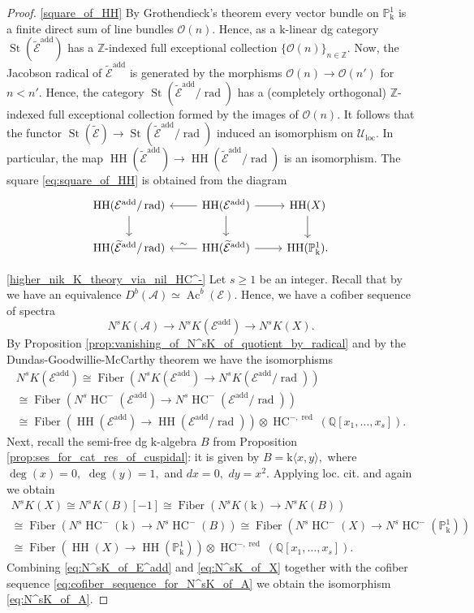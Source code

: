\documentclass[11pt,leqno]{amsart}
\numberwithin{equation}{section}
\def\Z{\mathbb{Z}}
\def\Q{\mathbb{Q}}
\def\wt{\widetilde}
\def\PP{{\mathbb P}}
\def\rad{\operatorname{rad}}
\newcommand{\Fiber}{\operatorname{Fiber}}
\newcommand{\loc}{\operatorname{loc}}
\newcommand{\red}{\operatorname{red}}
\newcommand{\St}{\operatorname{St}}
\newcommand{\mk}{\mathrm k}
\newcommand{\cO}{{\mathcal O}}
\newcommand{\cA}{{\mathcal A}}
\newcommand{\cE}{{\mathcal E}}
\newcommand{\cU}{{\mathcal U}}
\newcommand{\la}{\langle}
\newcommand{\ra}{\rangle}
\newcommand{\HH}{\operatorname{HH}}
\newcommand{\HC}{\operatorname{HC}}
\newcommand{\add}{\operatorname{add}}
\newcommand{\Ac}{\operatorname{Ac}}
\begin{document}
\begin{proof}
\ref{square_of_HH} By Grothendieck's theorem every vector bundle on $\PP^1_{\mk}$ is a finite direct sum of line bundles $\cO(n).$ Hence, as a $\mk$-linear dg category $\St(\wt{\cE}^{\add})$ has a $\Z$-indexed full exceptional collection $\{\cO(n)\}_{n\in\Z}.$ Now, the Jacobson radical of $\wt{\cE}^{\add}$ is generated by the morphisms $\cO(n)\to\cO(n')$ for $n<n'.$ Hence, the category $\St(\wt{\cE}^{\add}/\rad)$ has a (completely orthogonal) $\Z$-indexed full exceptional collection formed by the images of $\cO(n).$ It follows that the functor $\St(\wt{\cE})\to\St(\wt{\cE}^{\add}/\rad)$ induced an isomorphism on $\cU_{\loc}.$ In particular, the map $\HH(\wt{\cE}^{\add})\to\HH(\wt{\cE}^{\add}/\rad)$ is an isomorphism. The square \eqref{eq:square_of_HH} is obtained from the diagram
\begin{equation*}
\begin{tikzcd}
\HH(\cE^{\add}/\rad)\ar[d] & \HH(\cE^{\add})\ar[l]\ar[d]\ar[r] & \HH(X)\ar[d]\\
\HH(\wt{\cE}^{\add}/\rad) & \HH(\wt{\cE}^{\add})\ar[swap]{l}{\sim}\ar[r] & \HH(\PP^1_{\mk}).
\end{tikzcd}
\end{equation*}

\ref{higher_nik_K_theory_via_nil_HC^-} Let $s\geq 1$ be an integer. Recall that by \cite[Proposition 2.4]{Nee21} we have an equivalence $D^b(\cA)\simeq\Ac^b(\cE).$ Hence, we have a cofiber sequence of spectra
\begin{equation}\label{eq:cofiber_sequence_for_N^sK_of_A}
N^s K(\cA)\to N^s K(\cE^{\add})\to N^s K(X).
\end{equation}
By Proposition \ref{prop:vanishing_of_N^sK_of_quotient_by_radical} and by the Dundas-Goodwillie-McCarthy theorem \cite[Theorem 7.0.0.2]{DGM13} we have the isomorphisms
\begin{multline}\label{eq:N^sK_of_E^add}
N^s K(\cE^{\add})\cong \Fiber(N^s K(\cE^{\add})\to N^s K(\cE^{\add}/\rad))\\
\cong \Fiber(N^s \HC^-(\cE^{\add})\to N^s\HC^-(\cE^{\add}/\rad))\\
\cong \Fiber(\HH(\cE^{\add})\to\HH(\cE^{\add}/\rad))\otimes\HC^{-,\red}(\Q[x_1,\dots,x_s]).
\end{multline}
Next, recall the semi-free dg $\mk$-algebra $B$ from Proposition \ref{prop:ses_for_cat_res_of_cuspidal}: it is given by $B=\mk\la x, y\ra,$ where $\deg(x) = 0,$ $\deg(y) = 1,$ and $d x = 0,$ $d y = x^2.$ Applying loc. cit. and \cite[Theorem 7.0.0.2]{DGM13} again we obtain
\begin{multline}\label{eq:N^sK_of_X}
N^s K(X)\cong N^s K(B)[-1]\cong \Fiber(N^s K(\mk)\to N^s K(B))\\
\cong \Fiber(N^s \HC^-(\mk)\to N^s \HC^-(B))\cong\Fiber(N^s \HC^-(X)\to N^s \HC^-(\PP^1_{\mk}))\\
\cong \Fiber(\HH(X)\to\HH(\PP^1_{\mk}))\otimes\HC^{-,\red}(\Q[x_1,\dots,x_s]). 
\end{multline}
Combining \eqref{eq:N^sK_of_E^add} and \eqref{eq:N^sK_of_X} together with the cofiber sequence \eqref{eq:cofiber_sequence_for_N^sK_of_A} we obtain the isomorphism \eqref{eq:N^sK_of_A}.
\end{proof}
\end{document}
